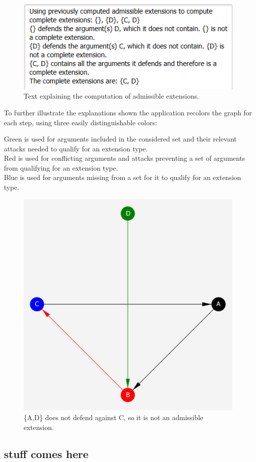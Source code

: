 \documentclass[draft,final]{vutinfth} %
\newcommand{\hl}{\par\medskip}
\begin{document}
\FloatBarrier
	\begin{figure}[!htb]
		\centering
		\includegraphics{pics/explanation.png}
		\caption{Text explaining the computation of admissible extensions.}
	\end{figure}
\FloatBarrier

To further illustrate the explanations shown the application recolors the graph for each step, using three easily distinguishable colors:\hl
Green is used for arguments included in the considered set and their relevant attacks needed to qualify for an extension type.\\
Red is used for conflicting arguments and attacks preventing a set of arguments from qualifying for an extension type.\\
Blue is used for arguments missing from a set for it to qualify for an extension type.

\FloatBarrier
	\begin{figure}[!htb]
		\centering
		\includegraphics{pics/colored.png}
		\caption{\{A,D\} does not defend against C, so it is not an admissible extension.}
	\end{figure}
\FloatBarrier

\subsection{stuff comes here}

\backmatter




\printindex

\printglossaries
\end{document}
